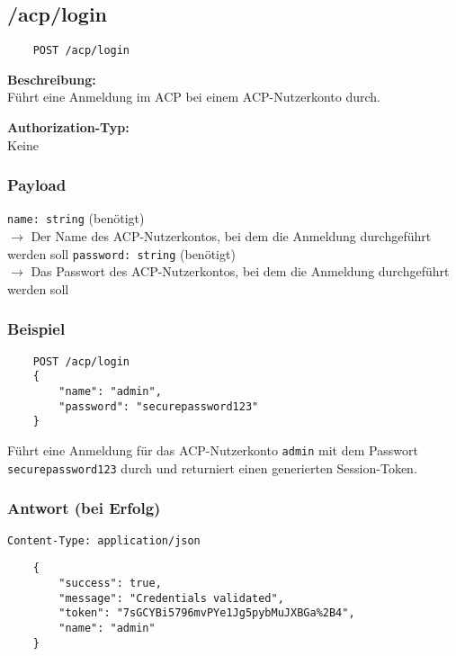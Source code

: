 \subsection{/acp/login}

\begin{lstlisting}
    POST /acp/login
\end{lstlisting}

\textbf{Beschreibung:} \\
Führt eine Anmeldung im ACP bei einem ACP-Nutzerkonto durch.

\textbf{Authorization-Typ:} \\
Keine

\subsubsection{Payload}

\lstinline{name: string} (benötigt) \\
$\rightarrow$ Der Name des ACP-Nutzerkontos, bei dem die Anmeldung durchgeführt werden soll
\lstinline{password: string} (benötigt) \\
$\rightarrow$ Das Passwort des ACP-Nutzerkontos, bei dem die Anmeldung durchgeführt werden soll

\subsubsection{Beispiel}

\begin{lstlisting}
    POST /acp/login
    {
        "name": "admin",
        "password": "securepassword123"
    }
\end{lstlisting}

Führt eine Anmeldung für das ACP-Nutzerkonto \lstinline{admin} mit dem Passwort \lstinline{securepassword123} durch und returniert einen generierten Session-Token.

\subsubsection{Antwort (bei Erfolg)}

\lstinline{Content-Type: application/json}
\begin{lstlisting}
    {
        "success": true, 
        "message": "Credentials validated",
        "token": "7sGCYBi5796mvPYe1Jg5pybMuJXBGa%2B4",
        "name": "admin"
    }
\end{lstlisting}
